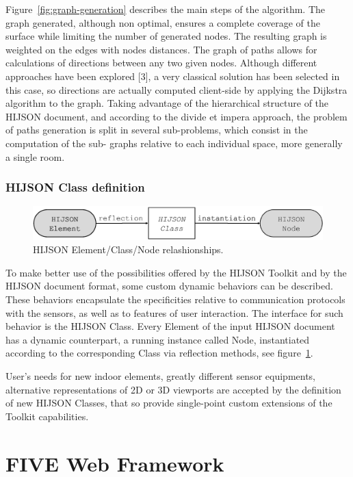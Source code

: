 \documentclass[]{egpubl}
\begin{document}
Figure~\ref{fig:graph-generation} describes the main steps of the algorithm.
The graph generated, although non optimal, ensures a complete coverage of the
surface while limiting the number of generated nodes. The resulting graph is
weighted on the edges with nodes distances. 
The graph of paths allows for calculations of directions between any two given
nodes. Although different approaches have been explored [3], a very classical
solution has been selected in this case, so directions are actually computed
client-side by applying the Dijkstra algorithm to the graph.
Taking advantage of the hierarchical structure of the HIJSON document, and
according to the divide et impera approach, the problem of paths generation is
split in several sub-problems, which consist in the computation of the sub-
graphs relative to each individual space, more generally a single room.


\subsubsection*{HIJSON Class definition}

\begin{figure}[h]
 \centering
 \includegraphics[width=\linewidth]{images/element-class-node}
 \caption{HIJSON Element/Class/Node relashionships.}
 \label{fig:el-class-node}
\end{figure}

To make better use of the possibilities offered by the HIJSON Toolkit and by
the HIJSON document format, some custom dynamic behaviors can be described.
These behaviors encapsulate the specificities relative to communication
protocols with the sensors, as well as to features of user interaction. The
interface for such behavior is the HIJSON Class. Every Element of the input
HIJSON document has a dynamic counterpart, a running instance called  Node,
instantiated according to the corresponding Class via reflection methods, see figure~\ref{fig:el-class-node}.


User's needs for new indoor elements, greatly different sensor equipments,
alternative representations of 2D or 3D viewports are accepted by the
definition of new HIJSON Classes, that so provide single-point custom
extensions of the Toolkit capabilities.

\section{FIVE Web Framework}
\end{document}
